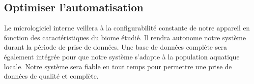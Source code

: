 

\subsection{Optimiser l’automatisation}
\label{s:beo_obj_automat}

Le micrologiciel interne veillera à la configurabilité constante de notre appareil en fonction des caractéristiques du biome étudié.
Il rendra autonome notre système durant la période de prise de données.
Une base de données complète sera également intégrée pour que notre système s’adapte à la population aquatique locale.
Notre système sera fiable en tout temps pour permettre une prise de données de qualité et complète.
